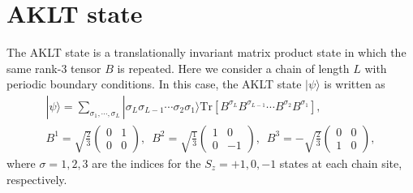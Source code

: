 \documentclass[11pt,a4paper,oneside]{article}
\begin{document}
\section*{AKLT state}

The AKLT state is a translationally invariant matrix product state in which the same rank-3 tensor $B$ is repeated.
Here we consider a chain of  length $L$ with periodic boundary conditions.
In this case, the AKLT state $| \psi \rangle$ is written as
\begin{equation}
\begin{gathered}
| \psi \rangle = \sum_{\sigma_1, \cdots, \sigma_L} | \sigma_L \sigma_{L-1} \cdots \sigma_{2} \sigma_{1} \rangle
\mathrm{Tr} [ B^{\sigma_L} B^{\sigma_{L-1}} \cdots B^{\sigma_{2}} B^{\sigma_{1}} ],
\\
B^1 = \sqrt{\frac{2}{3}}
\begin{pmatrix}
0 & 1 \\ 0 & 0
\end{pmatrix},
\,\,\,
B^2 = \sqrt{\frac{1}{3}}
\begin{pmatrix}
1 & 0 \\ 0 & -1
\end{pmatrix},
\,\,\,
B^3 = -\sqrt{\frac{2}{3}}
\begin{pmatrix}
0 & 0 \\ 1 & 0
\end{pmatrix},
\end{gathered}
\end{equation}
where $\sigma = 1, 2, 3$ are the indices for the $S_z = +1, 0, -1$ states at each chain site, respectively.
\end{document}

